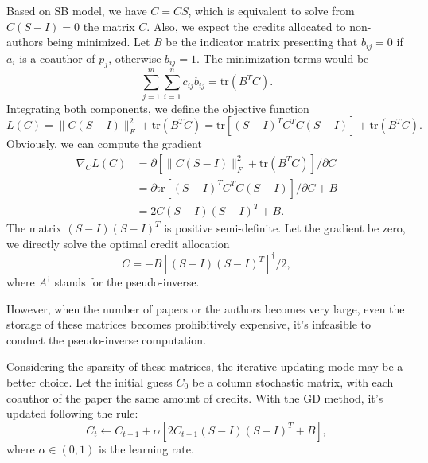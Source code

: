 \documentclass[12pt]{article}
\numberwithin{table}{section}
\begin{document}
Based on SB model, we have $C=C S$, which is equivalent to solve from $C(S-I)=0$ the matrix $C$.
Also, we expect the credits allocated to non-authors being minimized. Let $B$ be the indicator matrix presenting that $b_{ij}=0$ if $a_i$ is a coauthor of $p_j$, otherwise $b_{ij}=1$. The minimization terms would be 
\[
\sum_{j=1}^m \sum_{i=1}^n c_{ij} b_{ij}=\textrm{tr}(B^T C).
\]
Integrating both components, we define the objective function
\[
L(C) = \|C(S-I)\|_F^2 + \textrm{tr}(B^T C)=\textrm{tr}[(S-I)^T C^T C(S-I)] + \textrm{tr}(B^T C).
\]
Obviously, we can compute the gradient 
\[
\begin{array}{rl}
\nabla_C L(C) & = \partial [\|C(S-I)\|_F^2 + \textrm{tr}(B^T C)]/\partial C\\
&=\partial \textrm{tr}[(S-I)^T C^T C(S-I)]/\partial C + B\\
&=2C(S-I)(S-I)^T + B.
\end{array}
\]
The matrix $(S-I)(S-I)^T$ is positive semi-definite. Let the gradient be zero, we directly solve the optimal credit allocation
\[
C=-B[(S-I)(S-I)^T]^{\dagger}/2,
\]
where $A^\dagger$ stands for the pseudo-inverse.

However, when the number of papers or the authors becomes very large, even the storage of these matrices becomes prohibitively expensive, it's infeasible to conduct the pseudo-inverse computation. 

Considering the sparsity of these matrices, the iterative updating mode may be a better choice.
Let the initial guess $C_0$ be a column stochastic matrix, with each coauthor of the paper the same amount of credits. With the GD method, it's updated following the rule:
\[
C_t \leftarrow C_{t-1} + \alpha [2C_{t-1}(S-I)(S-I)^T + B],
\]
where $\alpha\in (0,1)$ is the learning rate.

%


\end{document}
